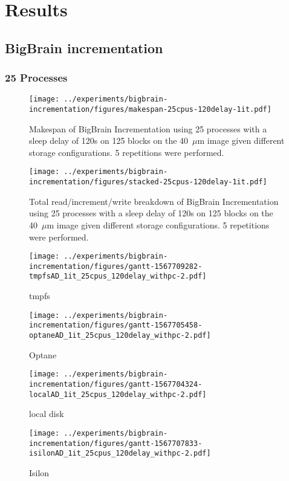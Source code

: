 \documentclass[conference]{IEEEtran}
\newcommand{\bigbrain}{BigBrain }
\begin{document}
\section{Results}

\subsection{\bigbrain incrementation}
\subsubsection{25 Processes}
\begin{figure}
    \texttt{[image: ../experiments/bigbrain-incrementation/figures/makespan-25cpus-120delay-1it.pdf]}
    \captionsetup{width=\columnwidth}
    \caption{Makespan of \bigbrain Incrementation using 25 processes with a sleep delay of 120s on 125 blocks on the 40~$\mu$m image given different storage configurations. 5 repetitions were performed.}\label{fig:makespan-25cpus}
\end{figure}
\begin{figure}
    \texttt{[image: ../experiments/bigbrain-incrementation/figures/stacked-25cpus-120delay-1it.pdf]}
    \captionsetup{width=\columnwidth}
    \caption{Total read/increment/write breakdown of \bigbrain Incrementation using 25 processes with a sleep delay of 120s on 125 blocks on the 40~$\mu$m image given different storage configurations. 5 repetitions were performed.}\label{fig:stacked-25cpus}
\end{figure}
\begin{figure*}
    \begin{subfigure}{\columnwidth}
        \centering
    \texttt{[image: ../experiments/bigbrain-incrementation/figures/gantt-1567709282-tmpfsAD\_1it\_25cpus\_120delay\_withpc-2.pdf]}
    \caption{tmpfs}
\end{subfigure}
\begin{subfigure}{\columnwidth}
        \centering
    \texttt{[image: ../experiments/bigbrain-incrementation/figures/gantt-1567705458-optaneAD\_1it\_25cpus\_120delay\_withpc-2.pdf]}
    \caption{Optane}
\end{subfigure}
\begin{subfigure}{\columnwidth}
        \centering
    \texttt{[image: ../experiments/bigbrain-incrementation/figures/gantt-1567704324-localAD\_1it\_25cpus\_120delay\_withpc-2.pdf]}
    \caption{local disk}
\end{subfigure}
\begin{subfigure}{\columnwidth}
        \centering
    \texttt{[image: ../experiments/bigbrain-incrementation/figures/gantt-1567707833-isilonAD\_1it\_25cpus\_120delay\_withpc-2.pdf]}
    \caption{Isilon}\label{fig:gantt25isilon}
\end{subfigure}
\caption{Gantt charts for each storage device (App Direct Mode) processing 125 blocks of the 40$\mu$m BigBrain using 25 processes and a sleep delay of 120s}\label{fig:gantt25}
\end{figure*}
\end{document}
